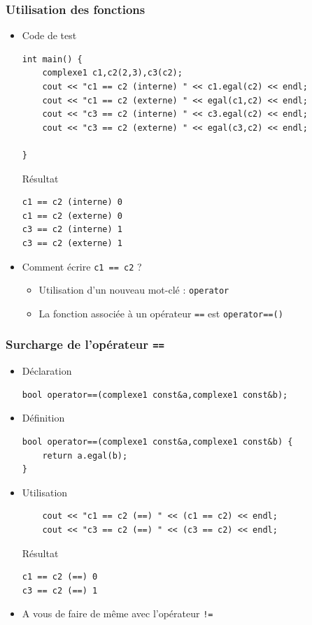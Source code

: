 \begin{frame}[fragile]\frametitle{Utilisation des fonctions}
\begin{itemize}
\item Code de test
\begin{lstlisting}
int main() {
    complexe1 c1,c2(2,3),c3(c2);
    cout << "c1 == c2 (interne) " << c1.egal(c2) << endl;
    cout << "c1 == c2 (externe) " << egal(c1,c2) << endl;
    cout << "c3 == c2 (interne) " << c3.egal(c2) << endl;
    cout << "c3 == c2 (externe) " << egal(c3,c2) << endl;

}
\end{lstlisting}
\begin{block}{Résultat}
{\tiny
\begin{verbatim}
c1 == c2 (interne) 0
c1 == c2 (externe) 0
c3 == c2 (interne) 1
c3 == c2 (externe) 1
\end{verbatim}
}
\end{block}
\item Comment écrire \texttt{c1 == c2} ?
\begin{itemize}
\item Utilisation d'un nouveau mot-clé : \texttt{operator}
\item La fonction associée à un opérateur \texttt{==} est \texttt{operator==()}
\end{itemize}
\end{itemize}
\end{frame}

\begin{frame}[fragile]\frametitle{Surcharge de l'opérateur \texttt{==}}
\begin{itemize}
\item Déclaration
\begin{lstlisting}
bool operator==(complexe1 const&a,complexe1 const&b);
\end{lstlisting}
\item Définition
\begin{lstlisting}
bool operator==(complexe1 const&a,complexe1 const&b) {
    return a.egal(b);
}
\end{lstlisting}
\item Utilisation
\begin{lstlisting}
    cout << "c1 == c2 (==) " << (c1 == c2) << endl;
    cout << "c3 == c2 (==) " << (c3 == c2) << endl;
\end{lstlisting}
\begin{block}{Résultat}
{\tiny
\begin{verbatim}
c1 == c2 (==) 0
c3 == c2 (==) 1
\end{verbatim}
}
\end{block}
\item A vous de faire de même avec l'opérateur \texttt{!=}
\end{itemize}
\end{frame}

